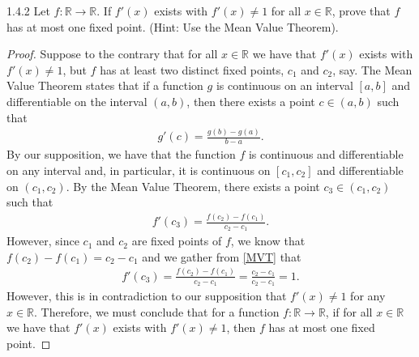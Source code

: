 \begin{problem}{1.4.2}
  Let $f: \mathbb{R} \to \mathbb{R}$. If $f'(x)$ exists with $f'(x) \neq 1$ for
  all $x \in \mathbb{R}$, prove that $f$ has at most one fixed point.
  (Hint: Use the Mean Value Theorem).
\end{problem}

\begin{proof}
  Suppose to the contrary that for all $x\in\mathbb{R}$ we have that $f'(x)$ exists
  with $f'(x) \neq 1$, but $f$ has at least two distinct fixed points, $c_1$ and $c_2$, say.
  The Mean Value Theorem states that if a function $g$ is continuous on an interval
  $[a, b]$ and differentiable on the interval $(a, b)$, then there exists a point $c \in (a, b)$
  such that
  \begin{align*}
    g'(c) = \frac{g(b)- g(a)}{b - a}.
  \end{align*}
  By our supposition, we have that the function $f$ is continuous and differentiable
  on any interval and, in particular, it is continuous on $[c_1, c_2]$ and differentiable
  on $(c_1, c_2)$. By the Mean Value Theorem, there exists a point $c_3 \in (c_1, c_2)$
  such that
  \begin{align}\label{MVT}
    f'(c_3) = \frac{f(c_2)- f(c_1)}{c_2 - c_1}.
  \end{align}
  However, since $c_1$ and $c_2$ are fixed points of $f$, we know that $f(c_2)- f(c_1) = c_2 - c_1$
  and we gather from \eqref{MVT} that
  \begin{align*}
    f'(c_3) = \frac{f(c_2)- f(c_1)}{c_2 - c_1} = \frac{c_2 - c_1}{c_2 - c_1} = 1.
  \end{align*}
  However, this is in contradiction to our supposition that $f'(x) \neq 1$ for
  any $x \in \mathbb{R}$. Therefore, we must conclude that for a function
  $f: \mathbb{R} \to \mathbb{R}$, if for all $x\in\mathbb{R}$ we have that $f'(x)$ exists
  with $f'(x) \neq 1$, then $f$ has at most one fixed point.
\end{proof}
\newpage
